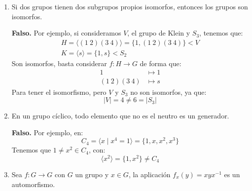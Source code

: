 \documentclass[12pt]{article}
\begin{document}
\begin{ejercicio}
\begin{enumerate}
            \item Si dos grupos tienen dos subgrupos propios isomorfos, entonces los grupos son isomorfos.

                \textbf{Falso.} Por ejemplo, si consideramos $V$, el grupo de Klein y $S_3$, tenemos que:
                \begin{gather*}
                    H = \langle (1\ 2)(3\ 4) \rangle = \{1, (1\ 2)(3\ 4)\} < V \\
                    K = \langle s \rangle = \{1, s\} < S_2
                \end{gather*}
                Son isomorfos, basta considerar $f:H\to G$ de forma que:
                \begin{align*}
                    1 &\longmapsto 1 \\
                    (1\ 2)(3\ 4) &\longmapsto s
                \end{align*}
                Para tener el isomorfismo, pero $V$ y $S_3$ no son isomorfos, ya que:
                \begin{equation*}
                    |V| = 4 \neq 6 = |S_3|
                \end{equation*}
            \item En un grupo cíclico, todo elemento que no es el neutro es un generador.

                \textbf{Falso.} Por ejemplo, en:
                \begin{equation*}
                    C_4 = \langle x \mid x^4 = 1 \rangle = \{1,x,x^2,x^3\}
                \end{equation*}
                Tenemos que $1\neq x^2\in C_4$, con:
                \begin{equation*}
                    \langle x^2 \rangle = \{1,x^2\} \neq C_4
                \end{equation*}
            \item Sea $f:G\to G$ con $G$ un grupo y $x\in G$, la aplicación $f_x(y) = xyx^{-1}$ es un automorfismo.


\end{enumerate}
\end{ejercicio}
\end{document}
